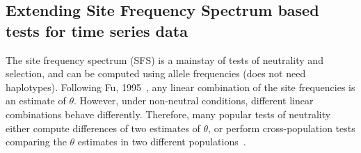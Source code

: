 \documentclass[11pt]{article}
\begin{document}
\subsection{Extending Site Frequency Spectrum  based tests for  time series data}
\label{sec:sfs-ts}
The site frequency spectrum (SFS) is a mainstay of tests of neutrality
and selection, and can be computed using allele frequencies (does not
need haplotypes). Following Fu, 1995~\cite{fu1995statistical}, any
linear combination of the site frequencies is an estimate of
$\theta$. However, under non-neutral conditions, different linear
combinations behave differently. Therefore, many popular tests of
neutrality either compute differences of two estimates of $\theta$, or
perform cross-population tests comparing the $\theta$ estimates in two
different
populations~\cite{achaz2009frequency,ronen2013learning,sabeti2007genome}. 
\end{document}
